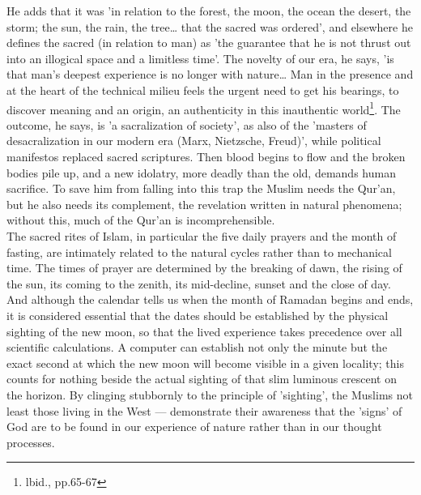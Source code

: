 \documentclass[11pt, b5paper, twoside]{book}
\begin{document}
He adds that it was 'in relation to the forest, the moon, the ocean the desert, the storm; the sun, 
the rain, the tree\ldots{} that the sacred was ordered', and elsewhere he defines the sacred (in relation 
to man) as 'the guarantee that he is not thrust out into an illogical space and a limitless time'. 
The novelty of our era, he says, 'is that man's deepest experience is no longer with nature\ldots{} Man in 
the presence and at the heart of the technical milieu feels the urgent need to get his bearings, to 
discover meaning and an origin, an authenticity in this inauthentic world\footnote{lbid., pp.65-67}. The outcome, he says, is 'a sacralization of society', as also of the 'masters of desacralization in our modern era (Marx, Nietzsche, Freud)', while political manifestos replaced sacred scriptures. Then blood begins to flow and the broken bodies pile up, and a new idolatry, more deadly than the old, demands human sacrifice. To save him from falling into this trap the Muslim needs the Qur'an, but he also needs its 
complement, the revelation written in natural phenomena; without this, much of the Qur'an is 
incomprehensible. \\

The sacred rites of Islam, in particular the five daily prayers and the month of fasting, are 
intimately related to the natural cycles rather than to mechanical time. The times of prayer are 
determined by the breaking of dawn, the rising of the sun, its coming to the zenith, its mid-decline, 
sunset and the close of day. And although the calendar tells us when the month of Ramadan begins and 
ends, it is considered essential that the dates should be established by the physical sighting of the 
new moon, so that the lived experience takes precedence over all scientific calculations. A computer 
can establish not only the minute but the exact second at which the new moon will become visible in a 
given locality; this counts for nothing beside the actual sighting of that slim luminous crescent on 
the horizon. By clinging stubbornly to the principle of 'sighting', the Muslims not least those 
living in the West --- demonstrate their awareness that the 'signs' of God are to be found in our 
experience of nature rather than in our thought processes. \\
\end{document}
